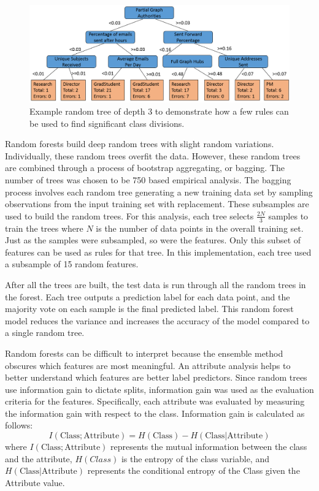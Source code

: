 \documentclass[12pt]{report}
\begin{document}
\begin{figure}[t]
    \centering
    \includegraphics[width=\columnwidth,trim={0mm 2.5mm 0mm 2mm},clip]{3_level_tree}
    \vspace{-15pt}
    \caption{Example random tree of depth 3 to demonstrate how a few rules can be used to find significant class divisions.}
    \label{fig:ex_tree}
\end{figure}

Random forests build deep random trees with slight random variations.
Individually, these random trees overfit the data.
However, these random trees are combined through a process of bootstrap aggregating, or bagging.
The number of trees was chosen to be 750 based empirical analysis.
The bagging process involves each random tree generating a new training data set by sampling observations from the input training set with replacement.
These subsamples are used to build the random trees.
For this analysis, each tree selects $\frac{2N}{3}$ samples to train the trees where $N$ is the number of data points in the overall training set.
Just as the samples were subsampled, so were the features.
Only this subset of features can be used as rules for that tree.
In this implementation, each tree used a subsample of 15 random features.

After all the trees are built, the test data is run through all the random trees in the forest.
Each tree outputs a prediction label for each data point, and the majority vote on each sample is the final predicted label.
This random forest model reduces the variance and increases the accuracy of the model compared to a single random tree.

Random forests can be difficult to interpret because the ensemble method obscures which features are most meaningful.
An attribute analysis helps to better understand which features are better label predictors.
Since random trees use information gain to dictate splits, information gain was used as the evaluation criteria for the features.
Specifically, each attribute was evaluated by measuring the information gain with respect to the class.
Information gain is calculated as follows:
\begin{equation}
I(\text{Class}; \text{Attribute}) = H(\text{Class}) - H(\text{Class} | \text{Attribute})
\end{equation} \label{eq:info_gained}
where $I(\text{Class}; \text{Attribute})$ represents the mutual information between the class and the attribute, $H(Class)$ is the entropy of the class variable, and  $H(\text{Class} | \text{Attribute})$ represents the conditional entropy of the Class given the Attribute value.  
\end{document}
